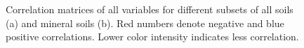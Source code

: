 \documentclass[10pt,twoside,dutch,english]{report}
\begin{document}
\begin{appendices}
	\begin{figure}[h] %
	\centering
    	\caption{Correlation matrices of all variables for different subsets of all soils (a) and mineral soils (b). Red numbers denote negative and blue positive correlations. Lower color intensity indicates less correlation. }
	\label{fig:results_corr_min}
\end{figure}
\begin{figure}[h] %
	\centering

\end{figure}
\end{appendices}
\end{document}
